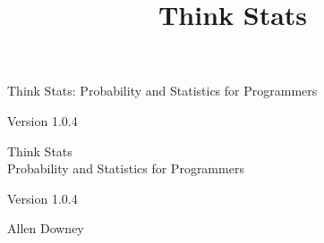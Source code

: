 \documentclass[12pt]{book}
\title{Think Stats}
\newcommand{\theversion}{1.0.4}
\begin{document}
\frontmatter




\newtheorem{ex}{Exercise}[chapter]

\begin{latexonly}

\renewcommand{\blankpage}{\thispagestyle{empty} \quad \newpage}



\thispagestyle{empty}

\begin{flushright}
\vspace*{2.0in}

\begin{spacing}{3}
{\huge Think Stats: Probability and Statistics for Programmers}\\
{\Large }
\end{spacing}

\vspace{0.25in}

Version \theversion

\vfill

\end{flushright}


\blankpage
\blankpage

\pagebreak
\thispagestyle{empty}

\begin{flushright}
\vspace*{2.0in}

\begin{spacing}{3}
{\huge Think Stats}\\
{\Large Probability and Statistics for Programmers}
\end{spacing}

\vspace{0.25in}

Version \theversion

\vspace{1in}


{\Large
Allen Downey\\
}



\end{flushright}
\end{latexonly}
\end{document}

